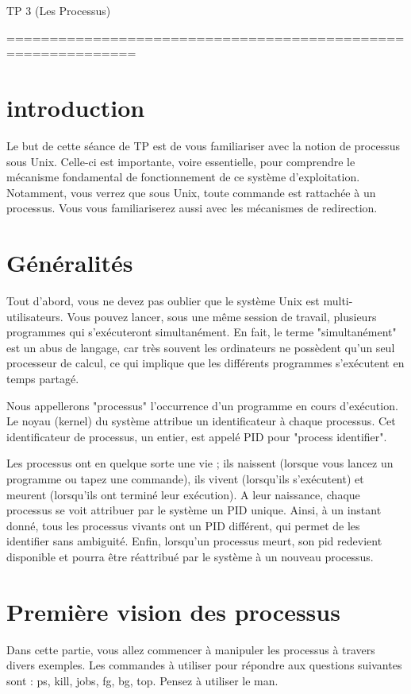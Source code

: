 \documentclass[10pt,a4paper]{article}
\begin{document}
\begin{center}
\huge{TP 3 (Les Processus)}
\end{center}
=============================================================

\section{introduction}
Le but de cette séance de TP est de vous familiariser avec la notion de processus sous Unix. Celle-ci est importante, voire essentielle, pour comprendre le mécanisme fondamental de fonctionnement de ce système d'exploitation. Notamment, vous verrez que sous Unix, toute commande est rattachée à un processus. Vous vous familiariserez aussi avec les mécanismes de redirection.

\section{Généralités}
Tout d'abord, vous ne devez pas oublier que le système Unix est multi-utilisateurs. Vous pouvez lancer, sous une même session de travail, plusieurs programmes qui s'exécuteront simultanément. En fait, le terme "simultanément" est un abus de langage, car très souvent les ordinateurs ne possèdent qu'un seul processeur de calcul,
ce qui implique que les différents programmes s'exécutent en temps
partagé.

Nous appellerons "processus" l'occurrence d'un programme en cours d'exécution. Le noyau (kernel) du système attribue un identificateur
à chaque processus. Cet identificateur de processus, un entier, est appelé PID pour "process identifier".

Les processus ont en quelque sorte une vie ; ils naissent (lorsque vous lancez un programme ou tapez une commande), ils vivent (lorsqu'ils s'exécutent) et meurent (lorsqu'ils ont terminé leur exécution). A leur naissance, chaque processus se voit attribuer par le système un PID unique. Ainsi, à un instant donné, tous les processus vivants ont un PID différent, qui permet de les identifier sans ambiguité. Enfin, lorsqu'un processus meurt, son pid redevient disponible et pourra être réattribué par le système à un nouveau processus.

\section{Première vision des processus}

Dans cette partie, vous allez commencer à manipuler les processus à travers divers exemples. Les commandes à utiliser pour répondre aux questions suivantes sont : ps, kill, jobs, fg, bg, top. Pensez à utiliser le man.
\end{document}
